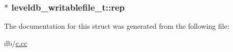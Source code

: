 \subsubsection[{rep}]{$\ast$ leveldb\+\_\+writablefile\+\_\+t\+::rep}\label{structleveldb__writablefile__t_a3cf7e2a9ac0560d667deee9d574d7761}


The documentation for this struct was generated from the following file\+:\begin{DoxyCompactItemize}
\item 
db/\hyperlink{c_8cc}{c.\+cc}\end{DoxyCompactItemize}
